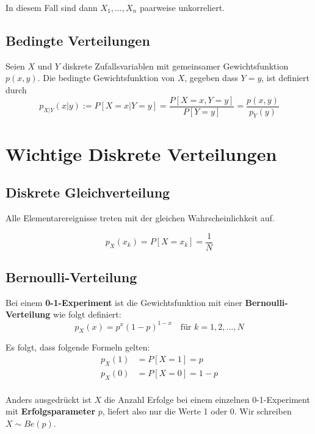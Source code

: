\documentclass[11pt]{article}
\begin{document}
In diesem Fall sind dann $X_1,...,X_n$ paarweise unkorreliert.

\subsection{Bedingte Verteilungen}

Seien $X$ und $Y$ diskrete Zufallsvariablen mit gemeinsamer Gewichtsfunktion $p(x, y)$. Die bedingte Gewichtsfunktion von $X$, gegeben dass $Y = y$, ist definiert durch
\begin{equation*}
	p_{X|Y}(x|y) := P[X=x|Y=y] = \frac{P[X=x,Y=y]}{P[Y=y]} = \frac{p(x,y)}{p_Y(y)}
\end{equation*}

\section{Wichtige Diskrete Verteilungen}

\subsection{Diskrete Gleichverteilung}

Alle Elementarereignisse treten mit der gleichen Wahrscheinlichkeit auf.

\begin{equation*}
	p_X(x_k) = P[X = x_k] = \frac{1}{N}
\end{equation*}

\subsection{Bernoulli-Verteilung}

Bei einem \textbf{0-1-Experiment} ist die Gewichtsfunktion mit einer \textbf{Bernoulli-Verteilung} wie folgt definiert:
\begin{equation*}
	p_X(x) = p^x(1-p)^{1-x} \quad\text{für } k = 1, 2, ..., N
\end{equation*}

Es folgt, dass folgende Formeln gelten:
\begin{equation*}
\begin{split}
	p_X(1) & = P[X = 1] = p \\
	p_X(0) & = P[X = 0] = 1-p \\
\end{split}
\end{equation*}

Anders ausgedrückt ist $X$ die Anzahl Erfolge bei einem einzelnen 0-1-Experiment mit \textbf{Erfolgsparameter} $p$, liefert also nur die Werte 1 oder 0. Wir schreiben $X \sim Be(p)$.
\end{document}
